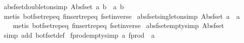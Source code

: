 \begin{isabellebody}
\endisatagproof
{\isafoldproof}%
%
\isadelimproof
\isanewline
%
\endisadelimproof
\isanewline
{}\isamarkupfalse%
\ abs{\isacharunderscore}fset{\isacharunderscore}doubleton{\isacharbrackleft}simp{\isacharbrackright}{\isacharcolon}\ {\isachardoublequoteopen}Abs{\isacharunderscore}fset\ {\isacharbraceleft}a{\isacharcomma}\ b{\isacharbraceright}\ {\isacharequal}\ {\isacharbraceleft}{\isacharbar}a{\isacharcomma}\ b{\isacharbar}{\isacharbraceright}{\isachardoublequoteclose}\isanewline
%
\isadelimproof
\ \ %
\endisadelimproof
%
\isatagproof
{}\isamarkupfalse%
\ {\isacharparenleft}metis\ bot{\isacharunderscore}fset{\isachardot}rep{\isacharunderscore}eq\ finsert{\isachardot}rep{\isacharunderscore}eq\ fset{\isacharunderscore}inverse{\isacharparenright}%
\endisatagproof
{\isafoldproof}%
%
\isadelimproof
\isanewline
%
\endisadelimproof
\isanewline
{}\isamarkupfalse%
\ abs{\isacharunderscore}fset{\isacharunderscore}singleton{\isacharbrackleft}simp{\isacharbrackright}{\isacharcolon}\ {\isachardoublequoteopen}Abs{\isacharunderscore}fset\ {\isacharbraceleft}a{\isacharbraceright}\ {\isacharequal}\ {\isacharbraceleft}{\isacharbar}a{\isacharbar}{\isacharbraceright}{\isachardoublequoteclose}\isanewline
%
\isadelimproof
\ \ %
\endisadelimproof
%
\isatagproof
{}\isamarkupfalse%
\ {\isacharparenleft}metis\ bot{\isacharunderscore}fset{\isachardot}rep{\isacharunderscore}eq\ finsert{\isachardot}rep{\isacharunderscore}eq\ fset{\isacharunderscore}inverse{\isacharparenright}%
\endisatagproof
{\isafoldproof}%
%
\isadelimproof
\isanewline
%
\endisadelimproof
\isanewline
{}\isamarkupfalse%
\ abs{\isacharunderscore}fset{\isacharunderscore}empty{\isacharbrackleft}simp{\isacharbrackright}{\isacharcolon}\ {\isachardoublequoteopen}Abs{\isacharunderscore}fset\ {\isacharbraceleft}{\isacharbraceright}\ {\isacharequal}\ {\isacharbraceleft}{\isacharbar}{\isacharbar}{\isacharbraceright}{\isachardoublequoteclose}\isanewline
%
\isadelimproof
\ \ %
\endisadelimproof
%
\isatagproof
{}\isamarkupfalse%
\ {\isacharparenleft}simp\ add{\isacharcolon}\ bot{\isacharunderscore}fset{\isacharunderscore}def{\isacharparenright}%
\endisatagproof
{\isafoldproof}%
%
\isadelimproof
\isanewline
%
\endisadelimproof
\isanewline
{}\isamarkupfalse%
\ fprod{\isacharunderscore}empty{\isacharbrackleft}simp{\isacharbrackright}{\isacharcolon}\ {\isachardoublequoteopen}{\isasymforall}a{\isachardot}\ fprod\ {\isacharbraceleft}{\isacharbar}{\isacharbar}{\isacharbraceright}\ a\ {\isacharequal}\ {\isacharbraceleft}{\isacharbar}{\isacharbar}{\isacharbraceright}{\isachardoublequoteclose}\isanewline

\end{isabellebody}
